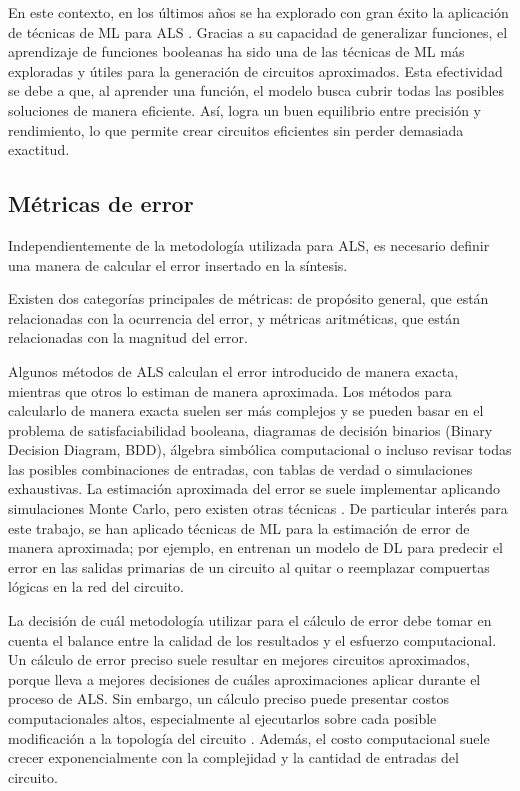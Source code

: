En este contexto, en los últimos años se ha explorado con gran éxito la
aplicación de técnicas de ML para ALS \cite{pasandi_approximate_2019,
rai_logic_2021, berndt_review_2022, prats_ramos_impact_2024}. Gracias a su
capacidad de generalizar funciones, el aprendizaje de funciones booleanas ha
sido una de las técnicas de ML más exploradas y útiles para la generación de
circuitos aproximados. Esta efectividad se debe a que, al aprender una función,
el modelo busca cubrir todas las posibles soluciones de manera eficiente. Así,
logra un buen equilibrio entre precisión y rendimiento, lo que permite crear
circuitos eficientes sin perder demasiada exactitud.

\subsection{Métricas de error}

Independientemente de la metodología utilizada para ALS, es necesario definir
una manera de calcular el error insertado en la síntesis.

Existen dos categorías principales de métricas: de propósito general, que están
relacionadas con la ocurrencia del error, y métricas aritméticas, que están
relacionadas con la magnitud del error.

Algunos métodos de ALS calculan el error introducido de manera exacta, mientras
que otros lo estiman de manera aproximada. Los métodos para calcularlo de
manera exacta suelen ser más complejos y se pueden basar en el problema de
satisfaciabilidad booleana, diagramas de decisión binarios (Binary Decision
Diagram, BDD), álgebra simbólica computacional o incluso revisar todas las
posibles combinaciones de entradas, con tablas de verdad o simulaciones
exhaustivas. La estimación aproximada del error se suele implementar aplicando
simulaciones Monte Carlo, pero existen otras técnicas
\cite{ammes_two-level_2022}. De particular interés para este trabajo, se han
aplicado técnicas de ML para la estimación de error de manera aproximada; por
ejemplo, en \cite{pasandi_deep-powerx_2020} entrenan un modelo de DL para
predecir el error en las salidas primarias de un circuito al quitar o
reemplazar compuertas lógicas en la red del circuito.

La decisión de cuál metodología utilizar para el cálculo de error debe tomar en
cuenta el balance entre la calidad de los resultados y el esfuerzo
computacional. Un cálculo de error preciso suele resultar en mejores circuitos
aproximados, porque lleva a mejores decisiones de cuáles aproximaciones aplicar
durante el proceso de ALS. Sin embargo, un cálculo preciso puede presentar
costos computacionales altos, especialmente al ejecutarlos sobre cada posible
modificación a la topología del circuito \cite{ammes_two-level_2022}. Además,
el costo computacional suele crecer exponencialmente con la complejidad y la
cantidad de entradas del circuito.

